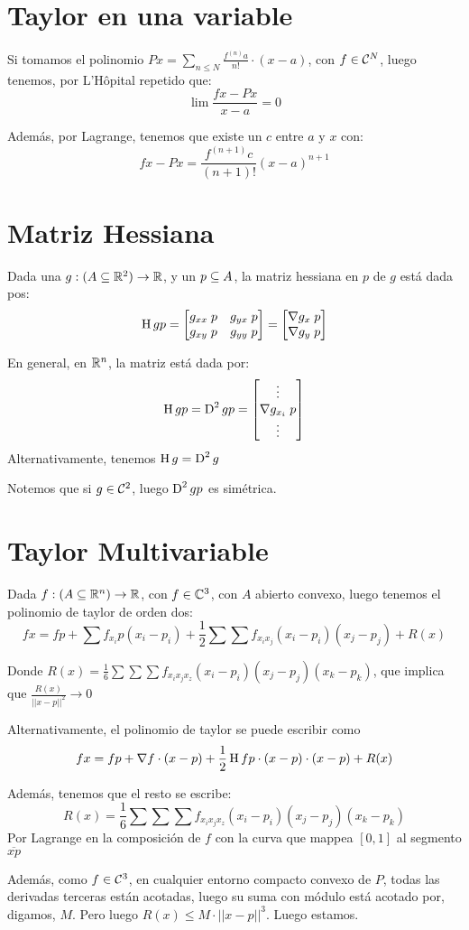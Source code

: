 \documentclass{article}
\begin{document}
\section*{Taylor en una variable}
Si tomamos el polinomio $Px = \sum_{n \leq N} \frac{f^{(n)}a}{n!} \cdot (x - a)$, con $f \in \mathcal{C}^N$, luego tenemos, por L'Hôpital repetido que:
\[
	\lim \frac{fx - Px}{x-a} = 0
\]

Además, por Lagrange, tenemos que existe un $c$ entre $a$ y $x$ con:
\[
	fx - Px = \frac{f^{(n+1)}c}{(n+1)!} (x-a)^{n+1}
\]

\section*{Matriz Hessiana}
Dada una $g : (A \subseteq \mathbb{R}^2) \to \mathbb{R}$, y un $p \subseteq A$, la matriz hessiana en $p$ de $g$ está dada pos:
\[
	\operatorname{H} g p = 
	\begin{bmatrix}
		g_{xx} \;p & g_{yx} \;p \\
		g_{xy} \;p & g_{yy} \;p
	\end{bmatrix} = 
	\begin{bmatrix}
		\nabla g_x \;p \\
		\nabla g_y \; p
	\end{bmatrix}
\]

En general, en $\mathbb{R}^n$, la matriz está dada por:
\[
	\operatorname{H} gp = \operatorname{D}^2 gp = 
	\begin{bmatrix}
		\vdots \\
		\nabla g_{x_i} \; p \\
		\vdots
	\end{bmatrix}
\]
Alternativamente, tenemos $\operatorname{H} g = \operatorname{D}^2 g$

Notemos que si $g \in \mathcal{C}^2$, luego $\operatorname{D}^2 g p$ es simétrica.

\section*{Taylor Multivariable}
Dada $f : (A \subseteq \mathbb{R}^n) \to \mathbb{R}$, con $f \in \mathbb{C}^3$, con $A$ abierto convexo, luego tenemos el polinomio de taylor de orden dos:
\[
	fx = fp + \sum f_{x_i}p (x_i-p_i) + \frac{1}{2}\sum \sum f_{x_ix_j} (x_i-p_i)(x_j-p_j) + R(x)
\]

Donde $R(x) = \frac{1}{6} \sum \sum \sum f_{x_ix_jx_z} (x_i-p_i) (x_j - p_j)(x_k-p_k)$, que implica que $\frac{R(x)}{||x-p||^2} \to 0$

Alternativamente, el polinomio de taylor se puede escribir como
\[
	fx = fp + \nabla f \cdot (x-p) + \frac{1}{2} \operatorname{H} fp \cdot (x-p) \cdot (x-p) + R(x)
\]

Además, tenemos que el resto se escribe:
\[R(x) = \frac{1}{6} \sum \sum \sum f_{x_ix_jx_z} (x_i-p_i) (x_j - p_j)(x_k-p_k)\]
Por Lagrange en la composición de $f$ con la curva que mappea $[0,1]$ al segmento $\overline{xp}$

Además, como $f \in \mathcal{C}^3$, en cualquier entorno compacto convexo de $P$, todas las derivadas terceras están acotadas, luego su suma con módulo está acotado por, digamos, $M$. Pero luego $R(x) \leq M \cdot ||x-p||^3$. Luego estamos.
\end{document}
